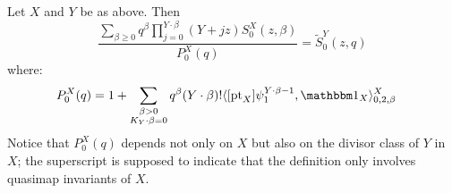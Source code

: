 \begin{thm} \label{Theorem Quantum Lefschetz}
Let $X$ and $Y$ be as above. Then
\begin{equation}\label{eqn:mirror}
\dfrac{\sum_{\beta\geq 0} q^\beta\prod_{j=0}^{Y\cdot\beta}(Y+jz)S_0^X(z,\beta)}{P_0^X(q)}= \tilde{S}_0^Y(z,q)
\end{equation}
where:
\begin{align*}
 P_0^X(q) %
            & = 1 + \sum_{\substack{\beta>0 \\ K_Y\cdot\beta=0}} q^\beta(Y\cdot\beta)!\langle [\pt_X] \psi_1^{Y\cdot\beta-1} ,\mathbbm 1_{X}\rangle_{0,2,\beta}^X
\end{align*}
Notice that $P_0^X(q)$ depends not only on $X$ but also on the divisor class of $Y$ in~$X$; the superscript is supposed to indicate that the definition only involves quasimap invariants of $X$.
\end{thm}

